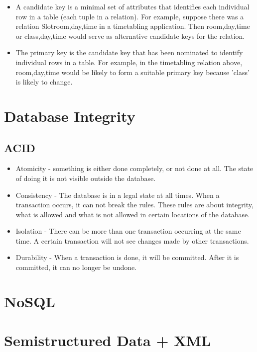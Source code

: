 \documentclass[10pt]{article}
\begin{document}
\begin{itemize}
      \item A candidate key is a minimal set of attributes that identifies each individual
      row in a table (each tuple in a relation). For example, suppose there was a
      relation Slotroom,day,time in a timetabling application. Then room,day,time or
      class,day,time would serve as alternative candidate keys for the relation.

      \item The primary key is the candidate key that has been nominated to identify individual
      rows in a table. For example, in the timetabling relation above, room,day,time
      would be likely to form a suitable primary key because ’class’ is likely to change.
    \end{itemize}


  \section*{Database Integrity}
    \subsection*{ACID}
      \begin{itemize}
        \item Atomicity - something is either done completely, or not done at all. The state of doing it is not visible outside the database.
        \item Consistency - The database is in a legal state at all times. When a transaction occurs, it can not break the rules. These rules are about integrity, what is allowed and what is not allowed in certain locations of the database.
        \item Isolation - There can be more than one transaction occurring at the same time. A certain transaction will not see changes made by other transactions.
        \item Durability - When a transaction is done, it will be committed. After it is committed, it can no longer be undone.
      \end{itemize}

  \section*{NoSQL}

  \section*{Semistructured Data + XML}
\end{document}
